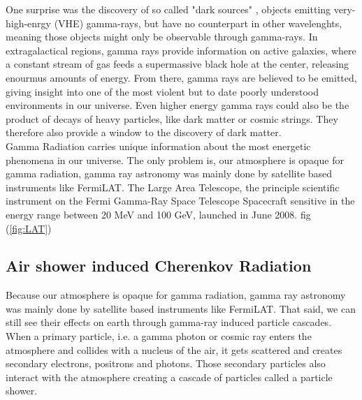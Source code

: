 \documentclass[12pt,article,type=msc,colorback,accentcolor=tud9c]{tudthesis}
\begin{document}
One surprise was the discovery of so called "dark sources" , objects emitting very-high-enrgy (VHE) gamma-rays, but have no counterpart in other wavelenghts, meaning those objects might only be observable through gamma-rays. In extragalactical regions, gamma rays provide information on active galaxies, where a constant stream of gas feeds a supermassive black hole at the center, releasing enourmus amounts of energy. From there, gamma rays are believed to be emitted, giving insight into one of the most violent but to date poorly understood environments in our universe. 
Even higher energy gamma rays could also be the product of decays of heavy particles, like dark matter or cosmic strings. They therefore also provide a window to the discovery of dark matter.\\
Gamma Radiation carries unique information about the most energetic phenomena in our universe. 
The only problem is, our atmosphere is opaque for gamma radiation, gamma ray astronomy was mainly done by satellite based instruments like FermiLAT. The Large Area Telescope, the principle scientific instrument on the Fermi Gamma-Ray Space Telescope Spacecraft sensitive in the energy range between 20 MeV and 100 GeV, launched in June 2008. fig (\ref{fig:LAT})







\subsection{Air shower induced Cherenkov Radiation}

\begin{wrapfigure}{R}{0.4\textwidth}
\centering
\texttt{[image: D:/OwnCloudData/00\_WriteUP/04\_Thesis/Pic/Proposal/Fig/\{gamma]}.jpg}
\caption{\label{fig:Cherenkov} The cone of Cherenkov light emitted by an extensive air shower}
\end{wrapfigure}

Because our atmosphere is opaque for gamma radiation, gamma ray astronomy was mainly done by satellite based instruments like FermiLAT.
That said, we can still see their effects on earth through gamma-ray induced particle cascades. When a primary particle, i.e. a gamma photon or cosmic ray enters the atmosphere and collides with a nucleus of the air, it gets scattered and creates secondary electrons, positrons and photons. Those secondary particles also interact with the atmosphere creating a cascade of particles called a particle shower. 
\end{document}
